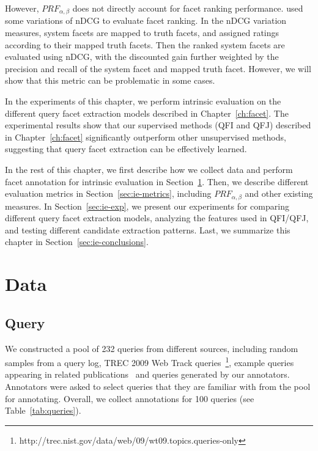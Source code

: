 However, $PRF_{\alpha,\beta}$ does not directly account for facet ranking performance. \citet{dou2011finding} used some variations of nDCG to evaluate facet ranking. In the nDCG variation measures, system facets are mapped to truth facets, and assigned ratings according to their mapped truth facets. Then the ranked system facets are evaluated using nDCG, with the discounted gain further weighted by the precision and recall of the system facet and mapped truth facet. However, we will show that this metric can be problematic in some cases.

In the experiments of this chapter, we perform intrinsic evaluation on the different query facet extraction models described in Chapter~\ref{ch:facet}. The experimental results show that our supervised methods (QFI and QFJ) described in Chapter~\ref{ch:facet} significantly outperform other unsupervised methods, suggesting that query facet extraction can be effectively learned.

In the rest of this chapter, we first describe how we collect data and perform facet annotation for intrinsic evaluation in Section~\ref{sec:ie-data}. Then, we describe different evaluation metrics in Section~\ref{sec:ie-metrics}, including $PRF_{\alpha,\beta}$ and other existing measures. In Section~\ref{sec:ie-exp}, we present our experiments for comparing different query facet extraction models, analyzing the features used in QFI/QFJ, and testing different candidate extraction patterns. Last, we summarize this chapter in Section~\ref{sec:ie-conclusions}. 


\section{Data} \label{sec:ie-data}
\subsection{Query}
We constructed a pool of 232 queries from different sources, including random samples from a query log, TREC 2009 Web Track queries~\footnote{http://trec.nist.gov/data/web/09/wt09.topics.queries-only}, example queries appearing in related publications~\cite{xue2011topic,wang2009mining} and queries generated by our annotators.
Annotators were asked to select queries that they are familiar with from the pool for annotating.
Overall, we collect annotations for 100 queries (see Table~\ref{tab:queries}).

